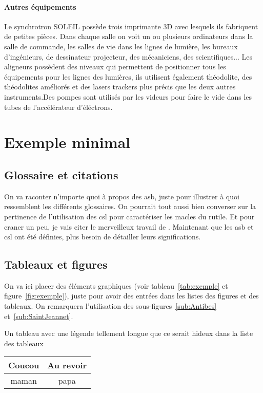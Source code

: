 			\paragraph{Autres équipements}
				Le synchrotron SOLEIL possède trois imprimante 3D avec lesquels ils fabriquent de petites pièces. Dans chaque salle on voit un ou plusieurs ordinateurs\; dans la salle de commande, les salles de vie dans les lignes de lumière, les bureaux d'ingénieurs, de dessinateur projecteur, des mécaniciens, des scientifiques... Les aligneurs possèdent des niveaux qui permettent de positionner tous les équipements pour les lignes des lumières, ils utilisent également théodolite, des théodolites améliorés et des lasers trackers plus précis que les deux autres instruments.Des pompes sont utilisés par les videurs pour faire le vide dans les tubes de l'accélérateur d'éléctrons.



\section{Exemple minimal}
	\subsection{Glossaire et citations}
		On va raconter n'importe quoi à propos des \gls{asb}, juste pour illustrer à quoi ressemblent les différents glossaires. On pourrait tout aussi bien converser sur la pertinence de l'utilisation des \gls{csl} pour caractériser les \glspl{macle} du \gls{rutile}. Et pour craner un peu, je vais citer le merveilleux travail de \citet{depriester2014thermomechanical}. Maintenant que les \gls{asb} et \gls{csl} ont été définies, plus besoin de détailler leurs significations.
		
	\subsection{Tableaux et figures}
	On va ici placer des éléments graphiques (voir tableau~\ref{tab:exemple} et figure~\ref{fig:exemple}), juste pour avoir des entrées dans les listes des figures et des tableaux. On remarquera l'utilisation des sous-figures~\ref{sub:Antibes} et~\ref{sub:SaintJeannet}.
	
	\begin{tableth}
		\caption[Légende courte pour l'exemple de tableau]{Un tableau avec une légende tellement longue que ce serait hideux dans la liste des tableaux}
			\label{tab:exemple}
		\begin{tabular}{c|c}
			Coucou	& Au revoir\\
			\hline
			maman	& papa
		\end{tabular}
	\end{tableth}


